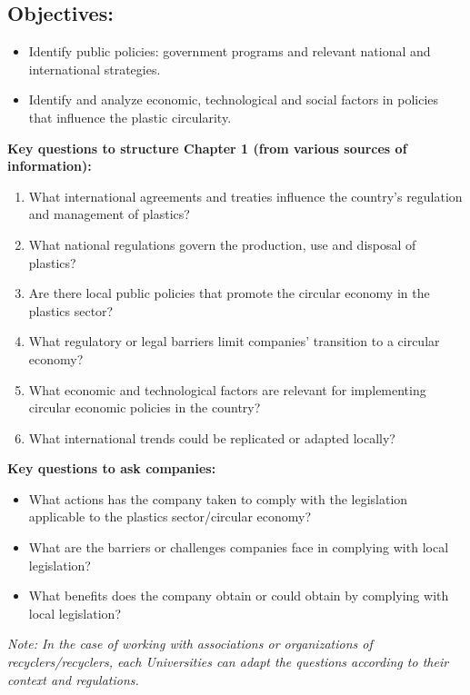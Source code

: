 \documentclass[
  12pt,
  oneside]{book}
\providecommand{\tightlist}{%
  \setlength{\itemsep}{0pt}\setlength{\parskip}{0pt}}
\begin{document}
\subsection{Objectives:}\label{objectives}

\begin{itemize}
\tightlist
\item
  Identify public policies: government programs and relevant national
  and international strategies.
\item
  Identify and analyze economic, technological and social factors in
  policies that influence the plastic circularity.
\end{itemize}

\textbf{Key questions to structure Chapter 1 (from various sources of
information):}

\begin{enumerate}
\def\labelenumi{\arabic{enumi}.}
\tightlist
\item
  What international agreements and treaties influence the country's
  regulation and management of plastics?
\item
  What national regulations govern the production, use and disposal of
  plastics?
\item
  Are there local public policies that promote the circular economy in
  the plastics sector?
\item
  What regulatory or legal barriers limit companies' transition to a
  circular economy?
\item
  What economic and technological factors are relevant for implementing
  circular economic policies in the country?
\item
  What international trends could be replicated or adapted locally?
\end{enumerate}

\textbf{Key questions to ask companies:}

\begin{itemize}
\tightlist
\item
  What actions has the company taken to comply with the legislation
  applicable to the plastics sector/circular economy?
\item
  What are the barriers or challenges companies face in complying with
  local legislation?
\item
  What benefits does the company obtain or could obtain by complying
  with local legislation?
\end{itemize}

\emph{Note: In the case of working with associations or organizations of
recyclers/recyclers, each Universities can adapt the questions according
to their context and regulations.}
\end{document}
